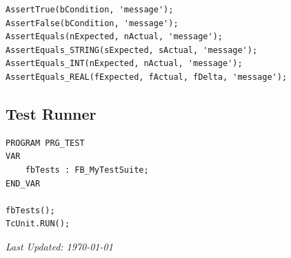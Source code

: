 \documentclass[11pt,a4paper]{article}
\begin{document}
\begin{lstlisting}
AssertTrue(bCondition, 'message');
AssertFalse(bCondition, 'message');
AssertEquals(nExpected, nActual, 'message');
AssertEquals_STRING(sExpected, sActual, 'message');
AssertEquals_INT(nExpected, nActual, 'message');
AssertEquals_REAL(fExpected, fActual, fDelta, 'message');
\end{lstlisting}

\subsection*{Test Runner}

\begin{lstlisting}
PROGRAM PRG_TEST
VAR
    fbTests : FB_MyTestSuite;
END_VAR

fbTests();
TcUnit.RUN();
\end{lstlisting}

\vfill

\begin{center}
\textit{Last Updated: \today}
\end{center}
\end{document}
